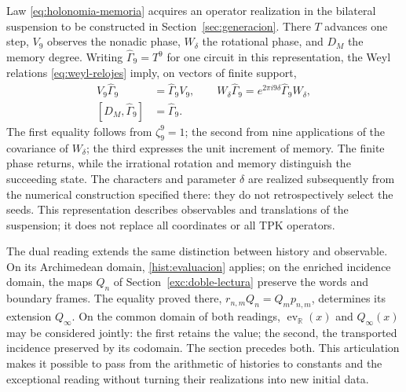 Law \eqref{eq:holonomia-memoria} acquires an operator realization
in the bilateral suspension to be constructed in
Section~\ref{sec:generacion}. There \(T\) advances one step,
\(V_9\) observes the nonadic phase, \(W_\delta\) the rotational phase, and
\(D_M\) the memory degree. Writing
\(\widehat\Gamma_9=T^9\) for one circuit in this representation,
the Weyl relations \eqref{eq:weyl-relojes} imply, on vectors
of finite support,
\begin{equation}
 \begin{aligned}
 V_9\widehat\Gamma_9&=\widehat\Gamma_9V_9,\qquad
 W_\delta\widehat\Gamma_9=e^{2\pi i9\delta}
     \widehat\Gamma_9W_\delta,\\
 [D_M,\widehat\Gamma_9]&=\widehat\Gamma_9.
 \end{aligned}
 \label{hist:tres-retornos}
\end{equation}
The first equality follows from \(\zeta_9^9=1\); the second from nine
applications of the covariance of \(W_\delta\); the third expresses
the unit increment of memory. The finite phase returns, while the
irrational rotation and memory distinguish the succeeding state. The
characters and parameter \(\delta\) are realized subsequently from the
numerical construction specified there: they do not retrospectively select
the seeds. This representation describes observables and translations of
the suspension; it does not replace all coordinates or all TPK operators.

The dual reading extends the same distinction between history and observable.
On its Archimedean domain, \eqref{hist:evaluacion} applies; on the
enriched incidence domain, the maps \(Q_n\) of
Section~\ref{exc:doble-lectura} preserve the words and boundary
frames. The equality proved there,
\(r_{n,m}Q_n=Q_mp_{n,m}\), determines its extension \(Q_\infty\).
On the common domain of both readings,
\(\operatorname{ev}_{\mathbb R}(x)\) and \(Q_\infty(x)\) may be considered jointly: the
first retains the value; the second, the transported incidence preserved by its
codomain. The section precedes both. This articulation makes it possible
to pass from the arithmetic of histories to constants and the exceptional
reading without turning their realizations into new initial data.
